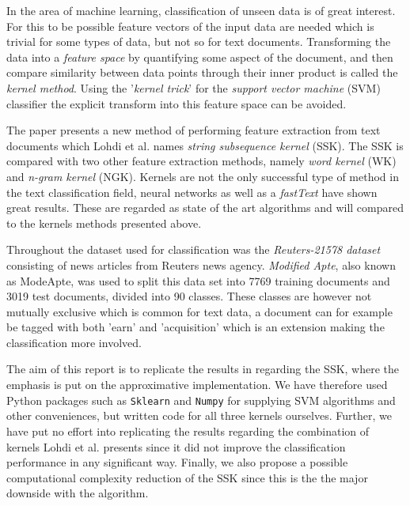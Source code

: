 
In the area of machine learning, classification of unseen data is of great interest. For this to be possible feature vectors of the input data are needed which is trivial for some types of data, but not so for text documents. Transforming the data into a \textit{feature space} by quantifying some aspect of the document, and then compare similarity between data points through their inner product is called the \textit{kernel method}. Using the '\textit{kernel trick}' for the \textit{support vector machine} (SVM) classifier the explicit transform into this feature space can be avoided.%

The paper \cite{lodhi} presents a new method of performing feature extraction from text documents which Lohdi et al. names \textit{string subsequence kernel} (SSK). The SSK is compared with two other feature extraction methods, namely \textit{word kernel} (WK) and \textit{n-gram kernel} (NGK). Kernels are not the only successful type of method in the text classification field, neural networks as well as a \textit{fastText} \cite{joulin2016bag} have shown great results. These are regarded as state of the art algorithms and will compared to the kernels methods presented above. 

Throughout \cite{lodhi} the dataset used for classification was the \textit{Reuters-21578 dataset} consisting of news articles from Reuters news agency. \textit{Modified Apte}, also known as ModeApte, was used to split this data set into 7769 training documents and 3019 test documents, divided into 90 classes. These classes are however not mutually exclusive which is common for text data, a document can for example be tagged with both 'earn' and 'acquisition' which is an extension making the classification more involved.

The aim of this report is to replicate the results in \cite{lodhi} regarding the SSK, where the emphasis is put on the approximative implementation. We have therefore used Python packages such as \texttt{Sklearn} and \texttt{Numpy} for supplying SVM algorithms and other conveniences, but written code for all three kernels ourselves. Further, we have put no effort into replicating the results regarding the combination of kernels Lohdi et al. presents since it did not improve the classification performance in any significant way. Finally, we also propose a possible computational complexity reduction of the SSK since this is the the major downside with the algorithm.

